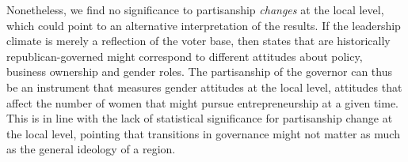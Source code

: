 Nonetheless, we find no significance to partisanship \textit{changes} at the local level, which could point to an alternative interpretation of the results. If the leadership climate is merely a reflection of the voter base, then states that are historically republican-governed might correspond to different attitudes about policy, business ownership and gender roles. The partisanship of the governor can thus be an instrument that measures gender attitudes at the local level, attitudes that affect the number of women that might pursue entrepreneurship at a given time. This is in line with the lack of statistical significance for partisanship change at the local level, pointing that transitions in governance might not matter as much as the general ideology of a region.















